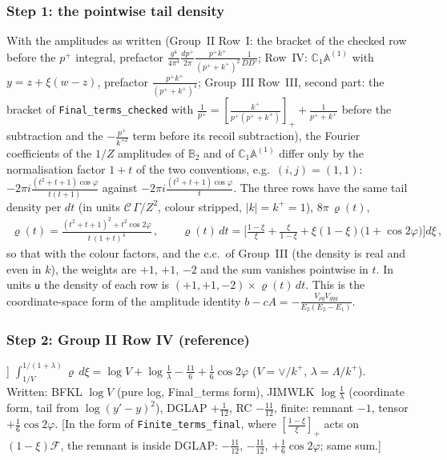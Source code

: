 \documentclass[10pt]{article}
\def\mf#1{\mathbb{#1}}
\begin{document}
\subsubsection{Step 1: the pointwise tail density}
\noindent [A, \texttt{t1}] With the amplitudes as written (Group~II Row~I: the bracket of the checked row before the $p^{+}$ integral, prefactor $\frac{g^{4}}{4\pi^{4}}\frac{dp^{+}}{2\pi}\frac{p^{+}k^{+}}{(p^{+}+k^{+})^{2}}\frac{1}{DD'}$; Row~IV: $\mf{C}_{1}\mf{A}^{(1)}$ with $y=z+\xi(w-z)$, prefactor $\frac{p^{+}k^{+}}{(p^{+}+k^{+})^{4}}$; Group~III Row~III, second part: the bracket of \texttt{Final\_terms\_checked} with $\frac{1}{p^{+}}=[\frac{k^{+}}{p^{+}(p^{+}+k^{+})}]_{+}+\frac{1}{p^{+}+k^{+}}$ before the subtraction and the $-\frac{p^{+}}{k^{+2}}$ term before its recoil subtraction), the Fourier coefficients of the $1/Z$ amplitudes of $\mf{B}_{2}$ and of $\mf{C}_{1}\mf{A}^{(1)}$ differ only by the normalisation factor $1+t$ of the two conventions, e.g.\ $(i,j)=(1,1)$: $-2\pi i\frac{(t^{2}+t+1)\cos\varphi}{t(t+1)}$ against $-2\pi i\frac{(t^{2}+t+1)\cos\varphi}{t}$. The three rows have the same tail density per $dt$ (in units $\mathcal{C}\,\Gamma/Z^{2}$, colour stripped, $|k|=k^{+}=1$), $8\pi\,\varrho(t)$,
\begin{align}
\varrho(t)=\frac{(t^{2}+t+1)^{2}+t^{2}\cos2\varphi}{t\,(1+t)^{4}}\,,\qquad \varrho(t)\,dt=\Big[\frac{1-\xi}{\xi}+\frac{\xi}{1-\xi}+\xi(1-\xi)\big(1+\cos2\varphi\big)\Big]d\xi\,,
\label{ft:rho}
\end{align}
so that with the colour factors, and the c.c.\ of Group~III (the density is real and even in $k$), the weights are $+1$, $+1$, $-2$ and the sum vanishes pointwise in $t$. In units $\mathsf{u}$ the density of each row is $(+1,+1,-2)\times\varrho(t)\,dt$. This is the coordinate-space form of the amplitude identity $b-cA=-\frac{V_{\rho g}V_{ggg}}{E_{2}(E_{2}-E_{1})}$.

\subsubsection{Step 2: Group II Row IV (reference)}
\noindent [A, \texttt{t3} [4]] $\int_{1/V}^{1/(1+\lambda)}\varrho\,d\xi=\log V+\log\frac1\lambda-\frac{11}{6}+\frac16\cos2\varphi$ ($V=\vee/k^{+}$, $\lambda=\Lambda/k^{+}$). Written: BFKL $\log V$ (pure log, Final\_terms form), JIMWLK $\log\frac1\lambda$ (coordinate form, tail from $\log(y'-y)^{2}$), DGLAP $+\frac1{12}$, RC $-\frac{11}{12}$, finite: remnant $-1$, tensor $+\frac16\cos2\varphi$. [In the form of \texttt{Finite\_terms\_final}, where $[\frac{1-\xi}{\xi}]_{+}$ acts on $(1-\xi)\mathcal{F}$, the remnant is inside DGLAP: $-\frac{11}{12}$, $-\frac{11}{12}$, $+\frac16\cos2\varphi$; same sum.]
\end{document}
